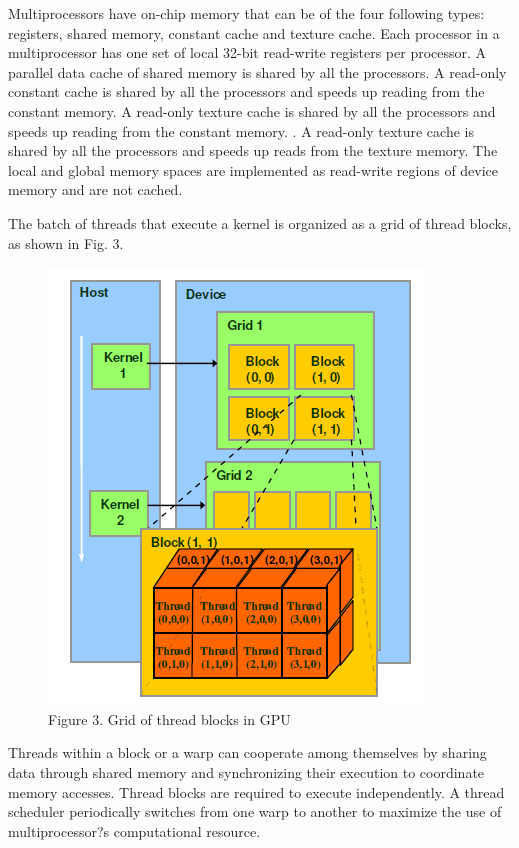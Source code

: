 \documentclass[letterpaper,twocolumn,10pt]{article}
\begin{document}
Multiprocessors have on-chip memory that can be of the four following types: registers, shared memory, constant cache and texture cache. Each processor in a multiprocessor has one set of local 32-bit read-write registers per processor. A parallel data cache of shared memory is shared by all the processors. A read-only constant cache is shared by all the processors and speeds up reading from the constant memory. A read-only texture cache is shared by all the processors and speeds up reading from the constant memory. . A read-only texture cache is shared by all the processors and speeds up reads from the texture memory. The local and global memory spaces are implemented as read-write regions of device memory and are not cached.

The batch of threads that execute a kernel is organized as a grid of thread blocks, as shown in Fig. 3. 

\begin{figure}[h!]
\centering
\includegraphics[scale=0.7]{cuda2.png}
\caption{Figure 3. Grid of thread blocks in GPU}
\label{threadsVsSync}
\end{figure}

Threads within a block or a warp can cooperate among themselves by sharing data through shared memory and synchronizing their execution to coordinate memory accesses. Thread blocks are required to execute independently. A thread scheduler periodically switches from one warp to another to maximize the use of multiprocessor?s computational resource.
\end{document}
